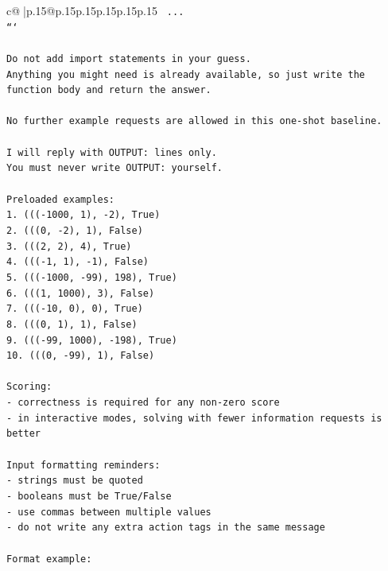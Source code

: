 \documentclass{article}
\begin{document}
{\begin{supertabular}{c@{$\;$}|p{.15\linewidth}@{}p{.15\linewidth}p{.15\linewidth}p{.15\linewidth}p{.15\linewidth}p{.15\linewidth}}
{{{\texttt{    ...} \\
\texttt{```} \\
\\ 
\texttt{Do not add import statements in your guess.} \\
\texttt{Anything you might need is already available, so just write the function body and return the answer.} \\
\\ 
\texttt{No further example requests are allowed in this one{-}shot baseline.} \\
\\ 
\texttt{I will reply with OUTPUT: lines only.} \\
\texttt{You must never write OUTPUT: yourself.} \\
\\ 
\texttt{Preloaded examples:} \\
\texttt{1. ((({-}1000, 1), {-}2), True)} \\
\texttt{2. (((0, {-}2), 1), False)} \\
\texttt{3. (((2, 2), 4), True)} \\
\texttt{4. ((({-}1, 1), {-}1), False)} \\
\texttt{5. ((({-}1000, {-}99), 198), True)} \\
\texttt{6. (((1, 1000), 3), False)} \\
\texttt{7. ((({-}10, 0), 0), True)} \\
\texttt{8. (((0, 1), 1), False)} \\
\texttt{9. ((({-}99, 1000), {-}198), True)} \\
\texttt{10. (((0, {-}99), 1), False)} \\
\\ 
\texttt{Scoring:} \\
\texttt{{-} correctness is required for any non{-}zero score} \\
\texttt{{-} in interactive modes, solving with fewer information requests is better} \\
\\ 
\texttt{Input formatting reminders:} \\
\texttt{{-} strings must be quoted} \\
\texttt{{-} booleans must be True/False} \\
\texttt{{-} use commas between multiple values} \\
\texttt{{-} do not write any extra action tags in the same message} \\
\\ 
\texttt{Format example:} \\
}}}
\end{supertabular}}
\end{document}
